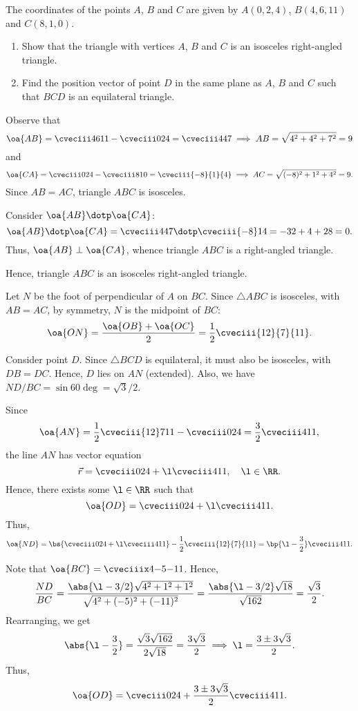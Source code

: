 \begin{problem}[\chili]
    The coordinates of the points $A$, $B$ and $C$ are given by $A(0, 2, 4)$, $B(4, 6, 11)$ and $C(8, 1, 0)$.
    
    \begin{enumerate}
        \item Show that the triangle with vertices $A$, $B$ and $C$ is an isosceles right-angled triangle.
        \item Find the position vector of point $D$ in the same plane as $A$, $B$ and $C$ such that $BCD$ is an equilateral triangle.
    \end{enumerate}
\end{problem}
\begin{solution}
    \begin{ppart}
        Observe that \[\oa{AB} = \cveciii46{11} - \cveciii024 = \cveciii447 \implies AB = \sqrt{4^2 + 4^2 + 7^2} = 9\] and \[\oa{CA} = \cveciii024 - \cveciii810 = \cveciii{-8}{1}{4} \implies AC = \sqrt{(-8)^2 + 1^2 + 4^2} = 9.\] Since $AB = AC$, triangle $ABC$ is isosceles.

        Consider $\oa{AB} \dotp \oa{CA}$: \[\oa{AB} \dotp \oa{CA} = \cveciii447 \dotp \cveciii{-8}14 = -32 + 4 + 28 = 0.\] Thus, $\oa{AB} \perp \oa{CA}$, whence triangle $ABC$ is a right-angled triangle.

        Hence, triangle $ABC$ is an isosceles right-angled triangle.
    \end{ppart}
    \begin{ppart}
        Let $N$ be the foot of perpendicular of $A$ on $BC$. Since $\triangle ABC$ is isosceles, with $AB = AC$, by symmetry, $N$ is the midpoint of $BC$: \[\oa{ON} = \frac{\oa{OB} + \oa{OC}}{2} = \frac12 \cveciii{12}{7}{11}.\]

        Consider point $D$. Since $\triangle BCD$ is equilateral, it must also be isosceles, with $DB = DC$. Hence, $D$ lies on $AN$ (extended). Also, we have $ND/BC = \sin 60\deg = \sqrt{3}/2$.

        Since \[\oa{AN} = \frac12 \cveciii{12}7{11} - \cveciii024 = \frac32 \cveciii411,\] the line $AN$ has vector equation \[\vec r = \cveciii024 + \l \cveciii411, \quad \l \in \RR.\] Hence, there exists some $\l \in \RR$ such that \[\oa{OD} = \cveciii024 + \l \cveciii411.\] Thus, \[\oa{ND} = \bs{\cveciii024 + \l \cveciii411} - \frac12 \cveciii{12}{7}{11} = \bp{\l - \frac32} \cveciii411.\]

        Note that $\oa{BC} = \cveciiix4{-5}{-11}$. Hence, \[\frac{ND}{BC} = \frac{\abs{\l - 3/2} \sqrt{4^2 + 1^2 + 1^2}}{\sqrt{4^2 + (-5)^2 + (-11)^2}} = \frac{\abs{\l - 3/2} \sqrt{18}}{\sqrt{162}} = \frac{\sqrt3}{2}.\] Rearranging, we get \[\abs{\l - \frac32} = \frac{\sqrt{3} \sqrt{162}}{2 \sqrt{18}} = \frac{3 \sqrt3}{2} \implies \l = \frac{3 \pm 3\sqrt3}{2}.\] Thus, \[\oa{OD} = \cveciii024 + \frac{3 \pm 3\sqrt3}{2} \cveciii411.\]
    \end{ppart}
\end{solution}

